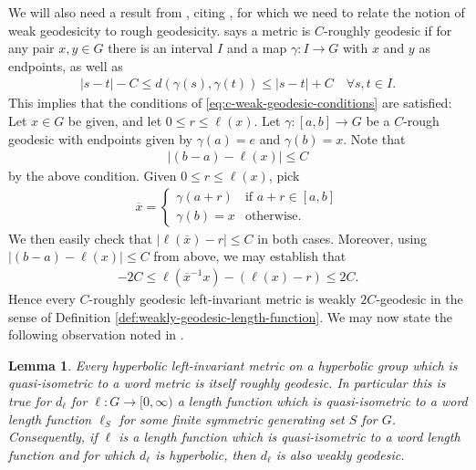 \documentclass[12pt,a4paper,oneside,final,reqno]{amsart}
\theoremstyle{plain}
\newtheorem{lemma}[theorem]{Lemma}
\theoremstyle{definition}
\begin{document}
We will also need a result from \cite[pg. 1858]{CantrellTanaka2025}, citing \cite[Proposition 5.6]{BonkSchramm2000}, for which we need to relate the notion of weak geodesicity to rough geodesicity. 
\cite{CantrellTanaka2025} says a metric is $C$-roughly geodesic if for any pair $x,y \in G$ there is an interval $I$ and a map $\gamma \colon I \to G$ with $x$ and $y$ as endpoints, as well as
\begin{align*}
    |s-t| - C \leq d(\gamma(s), \gamma(t)) \leq |s-t|+C \quad \forall s,t\in I.
\end{align*}
This implies that the conditions of \eqref{eq:c-weak-geodesic-conditions} are satisfied: Let $x \in G$ be given, and let $0 \leq r \leq \ell(x)$. Let $\gamma \colon [a,b] \to G$ be a $C$-rough geodesic with endpoints given by $\gamma(a)= e$ and $\gamma(b) = x$. Note that
\begin{align*}
    |(b-a) - \ell(x)| \leq C
\end{align*}
by the above condition. Given $0 \leq r \leq \ell(x)$, pick
\begin{align*}
\overline{x} =
    \begin{cases}
        \gamma(a+r) & \text{if $a+r \in [a,b]$} \\
        \gamma(b)=x & \text{otherwise}. 
    \end{cases}
\end{align*}
We then easily check that $\vert \ell(\overline{x}) - r \vert \leq C$ in both cases. Moreover, using $|(b-a) - \ell(x)| \leq C$ from above, we may establish that
\begin{align*}
    -2C \leq \ell(\overline{x}^{-1}x) - (\ell(x) - r) \leq 2C.
\end{align*}
Hence every $C$-roughly geodesic left-invariant metric is weakly $2C$-geodesic in the sense of Definition \ref{def:weakly-geodesic-length-function}.  
We may now state the following observation noted in \cite[pg. 1858]{CantrellTanaka2025}. 
\begin{lemma}\label{lemma:rough-geodesic-lfs-on-hyperbolic-groups}
     Every hyperbolic left-invariant metric on a hyperbolic group which is quasi-isometric to a word metric is itself roughly geodesic. In particular this is true for $d_\ell$ for $\ell \colon G \to [0,\infty)$ a length function which is quasi-isometric to a word length function $\ell_S$ for some finite symmetric generating set $S$ for $G$. Consequently, if $\ell$ is a length function which is quasi-isometric to a word length function and for which $d_\ell$ is hyperbolic, then $d_\ell$ is also weakly geodesic. 
\end{lemma}
\end{document}
